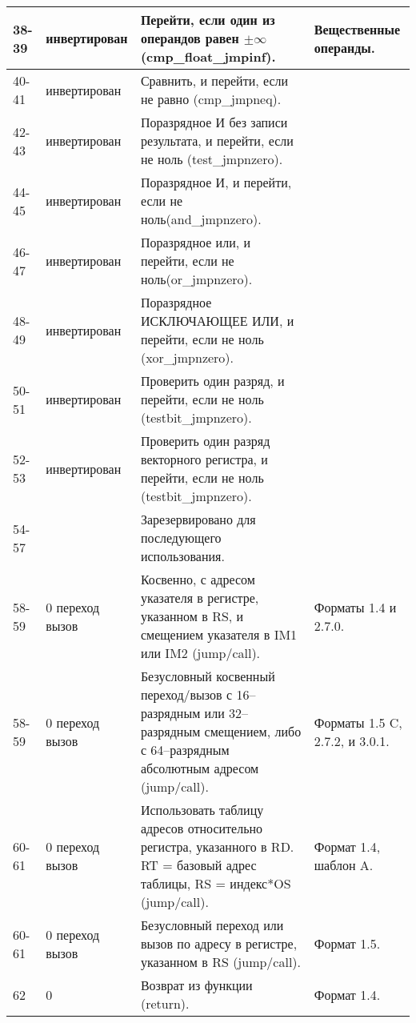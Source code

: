 \documentclass[forwardcom.tex]{subfiles}
\begin{document}
\begin{longtable}{|p{10mm}|p{18mm}|p{80mm}|p{35mm}|}
38-39 & ин\-вер\-ти\-ро\-ван    & Перейти, если один из операндов равен $\pm\infty$ (cmp\_float\_jmpinf).    & Вещественные операнды. \\ \hline
40-41 & ин\-вер\-ти\-ро\-ван    & Сравнить, и перейти, если не равно (cmp\_jmpneq). & \\ \hline
42-43 & ин\-вер\-ти\-ро\-ван    & Поразрядное И без записи результата, и перейти, если не ноль (test\_jmpnzero). &  \\ \hline
44-45 & ин\-вер\-ти\-ро\-ван    & Поразрядное И, и перейти, если не ноль\newline (and\_jmpnzero). & \\ \hline
46-47 & ин\-вер\-ти\-ро\-ван    & Поразрядное или, и перейти, если не ноль\newline (or\_jmpnzero). &  \\ \hline
48-49 & ин\-вер\-ти\-ро\-ван    & Поразрядное ИСКЛЮЧАЮЩЕЕ ИЛИ, и перейти, если не ноль (xor\_jmpnzero). & \\ \hline
50-51 & ин\-вер\-ти\-ро\-ван    & Проверить один разряд, и перейти, если не ноль (testbit\_jmpnzero). & \\ \hline
52-53 & ин\-вер\-ти\-ро\-ван    & Проверить один разряд векторного регистра, и перейти, если не ноль  (testbit\_jmpnzero). &  \\ \hline
54-57 & & Зарезервировано для последующего использования. & \\ \hline
58-59 & 0 переход \newline 1 вызов & Косвенно, с адресом указателя в регистре, указанном в RS, и смещением указателя в IM1 или IM2 (jump/call). & Форматы 1.4 и 2.7.0. \\ \hline
58-59 & 0 переход \newline 1 вызов & Безусловный косвенный переход/вызов с 16--разрядным или 32--разрядным смещением, либо с 64--разрядным абсолютным адресом  (jump/call). & Форматы 1.5 C, 2.7.2, и 3.0.1. \\ \hline
60-61 & 0 переход \newline 1 вызов & Использовать таблицу адресов относительно регистра, указанного в RD. RT = базовый адрес таблицы, RS = индекс*OS  (jump/call). & Формат 1.4, шаблон A. \\ \hline
60-61 & 0 переход \newline 1 вызов & Безусловный переход или вызов по адресу в регистре, указанном в RS  (jump/call).  & Формат 1.5. \\ \hline
62 & 0 & Возврат из функции (return). & Формат 1.4.  \\ \hline

\end{longtable}
\end{document}
